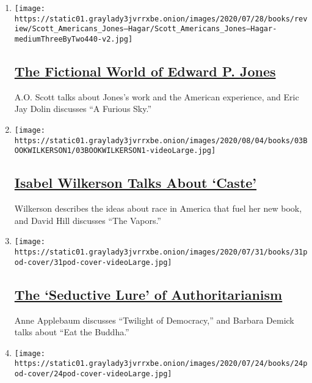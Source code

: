 \begin{enumerate}
\def\labelenumi{\arabic{enumi}.}
\item
  \texttt{[image: https://static01.graylady3jvrrxbe.onion/images/2020/07/28/books/review/Scott\_Americans\_Jones--Hagar/Scott\_Americans\_Jones--Hagar-mediumThreeByTwo440-v2.jpg]}

  \hypertarget{the-fictional-world-of-edward-p-jones}{%
  \subsection{\texorpdfstring{\href{/2020/08/14/books/review/podcast-a-o-scott-edward-p-jones-eric-jay-dolin-furious-sky-hurricanes.html}{The
  Fictional World of Edward P.
  Jones}}{The Fictional World of Edward P. Jones}}\label{the-fictional-world-of-edward-p-jones}}

  A.O. Scott talks about Jones's work and the American experience, and
  Eric Jay Dolin discusses ``A Furious Sky.''
\item
  \texttt{[image: https://static01.graylady3jvrrxbe.onion/images/2020/08/04/books/03BOOKWILKERSON1/03BOOKWILKERSON1-videoLarge.jpg]}

  \hypertarget{isabel-wilkerson-talks-about-caste}{%
  \subsection{\texorpdfstring{\href{/2020/08/07/books/review/podcast-isabel-wilkerson-caste-david-hill-vapors.html}{Isabel
  Wilkerson Talks About
  `Caste'}}{Isabel Wilkerson Talks About `Caste'}}\label{isabel-wilkerson-talks-about-caste}}

  Wilkerson describes the ideas about race in America that fuel her new
  book, and David Hill discusses ``The Vapors.''
\item
  \texttt{[image: https://static01.graylady3jvrrxbe.onion/images/2020/07/31/books/31pod-cover/31pod-cover-videoLarge.jpg]}

  \hypertarget{the-seductive-lure-of-authoritarianism}{%
  \subsection{\texorpdfstring{\href{/2020/07/31/books/review/podcast-twilight-democracy-anne-applebaum-eat-buddha-barbara-demick.html}{The
  `Seductive Lure' of
  Authoritarianism}}{The `Seductive Lure' of Authoritarianism}}\label{the-seductive-lure-of-authoritarianism}}

  Anne Applebaum discusses ``Twilight of Democracy,'' and Barbara Demick
  talks about ``Eat the Buddha.''
\item
  \texttt{[image: https://static01.graylady3jvrrxbe.onion/images/2020/07/24/books/24pod-cover/24pod-cover-videoLarge.jpg]}


\end{enumerate}
